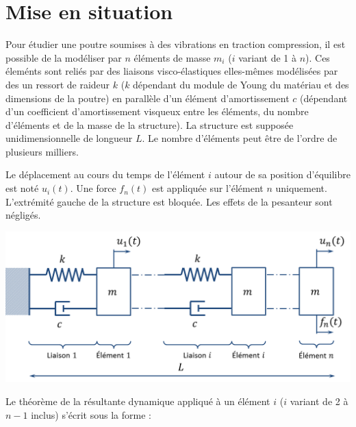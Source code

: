 \documentclass[10pt,fleqn]{article} %
\begin{document}

\vspace{10cm}
\pagestyle{fancy}
\thispagestyle{plain}


\def\columnseprulecolor{\color{ocre}}
\setlength{\columnseprule}{0.4pt} 

\section*{Mise en situation}

Pour étudier une poutre soumises à des vibrations en traction compression, il est possible de la modéliser par $n$ éléments de masse $m_i$ ($i$ variant de 1 à $n$). Ces éleménts sont reliés par des liaisons visco-élastiques elles-mêmes modélisées par des un ressort de raideur $k$ ($k$ dépendant du module de Young du matériau et des dimensions de la poutre) en parallèle d'un élément d'amortissement $c$ (dépendant d'un coefficient d'amortissement visqueux entre les éléments, du nombre d'éléments et de la masse de la structure). La structure est supposée unidimensionnelle de longueur $L$. Le nombre d'éléments peut être de l'ordre de plusieurs milliers. 

Le déplacement au cours du temps de l'élément $i$ autour de sa position d'équilibre est noté $u_i(t)$. Une force $f_n(t)$ est appliquée sur l'élément $n$ uniquement. L'extrémité gauche de
la structure est bloquée. Les effets de la pesanteur sont négligés.
\begin{center}
\includegraphics[width=.49\textwidth]{images/structure}
\end{center}



Le théorème de la résultante dynamique appliqué à un élément $i$ ($i$ variant de 2 à $n-1$ inclus) s'écrit sous la forme : 

\end{document}
